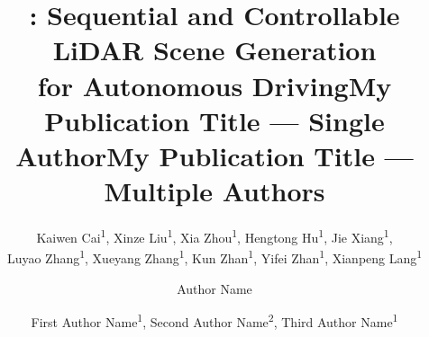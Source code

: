 \documentclass[letterpaper]{article} %
\title{\sysname: Sequential and Controllable LiDAR Scene Generation \\for Autonomous Driving}
\author{
    Kaiwen Cai\textsuperscript{\rm 1}\equalcontrib,
    Xinze Liu\textsuperscript{\rm 1}\equalcontrib,
    Xia Zhou\textsuperscript{\rm 1}\equalcontrib,
    Hengtong Hu\textsuperscript{\rm 1},
    Jie Xiang\textsuperscript{\rm 1}, \\
    Luyao Zhang\textsuperscript{\rm 1},
    Xueyang Zhang\textsuperscript{\rm 1},
    Kun Zhan\textsuperscript{\rm 1},
    Yifei Zhan\textsuperscript{\rm 1},
    Xianpeng Lang\textsuperscript{\rm 1}
}
\title{My Publication Title --- Single Author}
\author {
    Author Name
}
\title{My Publication Title --- Multiple Authors}
\author {
    First Author Name\textsuperscript{\rm 1},
    Second Author Name\textsuperscript{\rm 2},
    Third Author Name\textsuperscript{\rm 1}
}
\begin{document}
\maketitle









\bigskip


\end{document}
